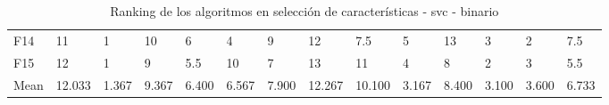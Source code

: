 \begin{table}
\begin{adjustbox}{width=\linewidth}
\begin{tabular}{llllllllllllll}
            F14  & 11     & 1     & 10    & 6     & 4     & 9     & 12     & 7.5    & 5     & 13    & 3     & 2     & 7.5   \\
            F15  & 12     & 1     & 9     & 5.5   & 10    & 7     & 13     & 11     & 4     & 8     & 2     & 3     & 5.5   \\
            Mean & 12.033 & 1.367 & 9.367 & 6.400 & 6.567 & 7.900 & 12.267 & 10.100 & 3.167 & 8.400 & 3.100 & 3.600 & 6.733 \\
            \bottomrule
        \end{tabular}
    \end{adjustbox}
    \caption{Ranking de los algoritmos en selección de características - svc - binario}
    \label{tab:ranking_sel_rate_bin_svc}
\end{table}

